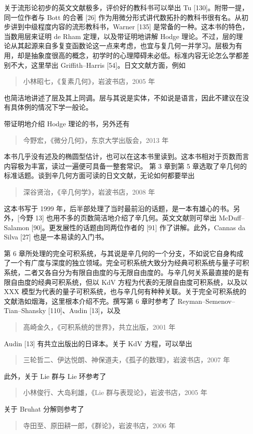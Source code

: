 关于流形论初步的英文文献极多，评价好的教科书可以举出 Tu [130]。附带一提，同一位作者与 Bott 的合著 [26] 作为用微分形式讲代数拓扑的教科书很有名。从初步讲到中级程度内容的流形教科书，Warner [135] 是常备的一种。这本书的特色，当数用层来证明 de Rham 定理，以及带证明地讲解 Hodge 理论。不过，层的理论从其起源来自多复变函数论这一点来考虑，也宜与复几何一并学习。层极为有用，却是抽象度很高的概念，初学时的心理障碍未必低。标准内容无论怎么学都差别不大，这里举出 Griffith–Harris [54]。日文文献方面，例如
\begin{quote}
\noindent [小林 05] 小林昭七，《复素几何》，岩波书店，2005 年
\end{quote}
也简洁地讲述了层及其上同调。层与其说是实体，不如说是语言，因此不建议在没有具体例的情况下学一般论。

带证明地介绍 Hodge 理论的书，另外还有
\begin{quote}
\noindent [今野 13] 今野宏，《微分几何》，东京大学出版会，2013 年
\end{quote}
本书几乎没有述及的椭圆型估计，也可以在这本书里读到。这本书相对于页数而言内容极为丰富，读过一遍便可具备一整套常识。
第 3 章到第 5 章选取了辛几何的标准话题。谈到辛几何方面可读的日文文献，无论如何都要举出
\begin{quote}
\noindent [深谷 08] 深谷贤治，《辛几何学》，岩波书店，2008 年
\end{quote}
这本书写于 1999 年，后半部处理了当时最前沿的话题，是一本有雄心的书。另外，[今野 13] 也用不多的页数简洁地介绍了辛几何。英文文献则可举出 McDuff–Salamon [90]。更发展性的话题由同两位作者的 [91] 作了讲解。此外，Cannas da Silva [27] 也是一本易读的入门书。

第 6 章所处理的完全可积系统，与其说是辛几何的一个分支，不如说它自身构成了一个有广度与深度的独立领域。完全可积系统大致分为经典可积系统与量子可积系统，二者又各自分为有限自由度的与无限自由度的。与辛几何关系最直接的是有限自由度的经典可积系统，但以 KdV 方程为代表的无限自由度可积系统，以及以 XXX 模型为代表的量子可积系统，也与辛几何有种种关联。关于完全可积系统的文献浩如烟海，这里根本介绍不完。撰写第 6 章时参考了 Reyman–Semenov–Tian–Shansky [110]、Audin [13]，以及
\begin{quote}
\noindent [高崎 01] 高崎金久，《可积系统的世界》，共立出版，2001 年
\end{quote}
Audin [13] 有共立出版出的日译本。关于 KdV 方程，可以举出
\begin{quote}
\noindent [三伊神 07] 三轮哲二、伊达悦朗、神保道夫，《孤子的数理》，岩波书店，2007 年
\end{quote}
此外，关于 Lie 群与 Lie 环参考了
\begin{quote}
\noindent [小大 05] 小林俊行、大岛利雄，《Lie 群与表现论》，岩波书店，2005 年
\end{quote}
关于 Bruhat 分解则参考了
\begin{quote}
\noindent [寺原 06] 寺田至、原田耕一郎，《群论》，岩波书店，2006 年
\end{quote}

